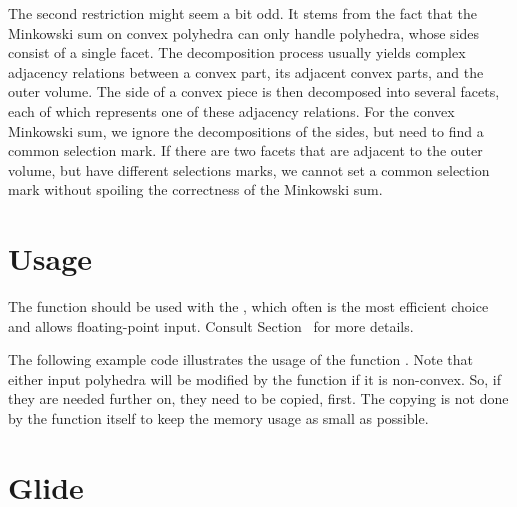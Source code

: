 The second restriction might seem a bit odd. It stems from the fact
that the Minkowski sum on convex polyhedra can only handle polyhedra,
whose sides consist of a single facet. The decomposition process
usually yields complex adjacency relations between a convex part, its
adjacent convex parts, and the outer volume. The side of a convex
piece is then decomposed into several facets, each of which represents
one of these adjacency relations. For the convex Minkowski sum, we
ignore the decompositions of the sides, but need to find a common
selection mark. If there are two facets that are adjacent to the outer
volume, but have different selections marks, we cannot set a common
selection mark without spoiling the correctness of the Minkowski sum.

\section{Usage}

The function  should be used with the
, which often is
the most efficient choice and allows floating-point input. Consult
Section~\label{sectionNef_3IO} for more details.

The following example code illustrates the usage of the function
. Note that either input polyhedra will be
modified by the function if it is non-convex. So, if they are needed
further on, they need to be copied, first. The copying is not done by
the function itself to keep the memory usage as small as possible.


\section{Glide}

